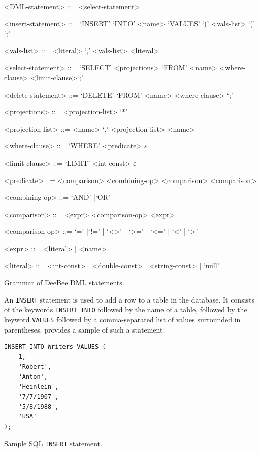 \begin{listing}[h!]
\begin{grammar}
<DML-statement> ::= <select-statement>  

<insert-statement> ::= `INSERT' `INTO' <name> `VALUES' `(' <vals-list> `)' `;'

<vals-list> ::= <literal> `,' <vals-list> \alt <literal>

<select-statement> ::= `SELECT' <projections> `FROM' <name> <where-clause> <limit-clause>`;'

<delete-statement> ::= `DELETE' `FROM' <name> <where-clause> `;'

<projections> ::= <projection-list> \alt `*'

<projection-list> ::= <name> `,' <projection-list> \alt <name>

<where-clause> ::= `WHERE' <predicate> \alt $\varepsilon$

<limit-clause> ::= `LIMIT' <int-const> \alt $\varepsilon$

<predicate> ::= <comparison> <combining-op> <comparison> \alt <comparison>

<combining-op> ::= `AND'  |`OR'

<comparison> ::= <expr> <comparison-op> <expr>

<comparison-op> ::= `=' |`!=' | `<>' | `>=' | `<='  | `<' | `>'

<expr> ::= <literal> | <name>

<literal> ::= <int-const> | <double-const> | <string-const> | `null' 
\end{grammar}
\caption{Grammar of DeeBee DML statements.}
\label{lst:dml-grammar}
\end{listing}

An \texttt{INSERT} statement is used to add a row to a table in the database. It consists of the keywords \texttt{INSERT INTO} followed by the name of a table, followed by the keyword \texttt{VALUES} followed by a comma-separated list of values surrounded in parentheses.  provides a sample of such a statement.
\begin{listing}[h]
    \begin{verbatim}
INSERT INTO Writers VALUES (
	1,
	'Robert',
	'Anton',
	'Heinlein', 
	'7/7/1907',
	'5/8/1988',
	'USA'
);
        \end{verbatim}
        \caption{Sample SQL \texttt{INSERT} statement.}
        \label{lst:insert}
        \end{listing}
        
